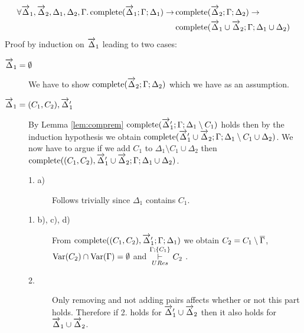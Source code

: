 \begin{mylemma}\label{lem:compunion}
\begin{align*}
\forall  \overrightarrow{\Delta}_1, \overrightarrow{\Delta}_2, \Delta_1, \Delta_2, \Gamma. \, \mathrm{complete}(\overrightarrow{\Delta}_1;\Gamma; \Delta_1) \to \, &\mathrm{complete}(\overrightarrow{\Delta}_2;\Gamma; \Delta_2) \to \\
&\mathrm{complete}(\overrightarrow{\Delta}_1 \cup \overrightarrow{\Delta}_2;\Gamma; \Delta_1 \cup \Delta_2)
\end{align*}
Proof by induction on $\overrightarrow{\Delta}_1$ leading to two cases:

\begin{description}
\item[$\overrightarrow{\Delta}_1 = \emptyset$]
We have to show $\mathrm{complete}(\overrightarrow{\Delta}_2;\Gamma; \Delta_2)$ which we have as an assumption.

\item[$\overrightarrow{\Delta}_1 = (C_1, C_2), \overrightarrow{\Delta}_1'$]
By Lemma \ref{lem:comprem} $\mathrm{complete}(\overrightarrow{\Delta}_1';\Gamma; \Delta_1 \setminus C_1)$ holds then by the induction hypothesis we obtain $\mathrm{complete}(\overrightarrow{\Delta}_1' \cup \overrightarrow{\Delta}_2;\Gamma; \Delta_1 \setminus C_1 \cup \Delta_2)$. We now have to argue if we add $C_1$ to $\Delta_1 \setminus C_1 \cup \Delta_2$ then $\mathrm{complete}((C_1, C_2), \overrightarrow{\Delta}_1' \cup \overrightarrow{\Delta}_2;\Gamma; \Delta_1 \cup \Delta_2)$.
\begin{description}
\item[1. a)] Follows trivially since $\Delta_1$ contains $C_1$.
\item[1. b), c), d)] From $\mathrm{complete}((C_1,C_2), \overrightarrow{\Delta}_1';\Gamma; \Delta_1)$ we obtain $C_2 = C_1 \setminus \overline{\Gamma}$, $\mathrm{Var}(C_2) \cap \mathrm{Var}(\Gamma) = \emptyset$ and $\overset{\Gamma;\{C_1 \}}{\underset{URes}{\vdash}} C_2$ .
\item[2.] Only removing and not adding pairs affects whether or not this part holds. Therefore if 2. holds for $\overrightarrow{\Delta}_1' \cup \overrightarrow{\Delta}_2$ then it also holds for $\overrightarrow{\Delta}_1 \cup \overrightarrow{\Delta}_2$.

\end{description}  
\end{description}

\end{mylemma}

